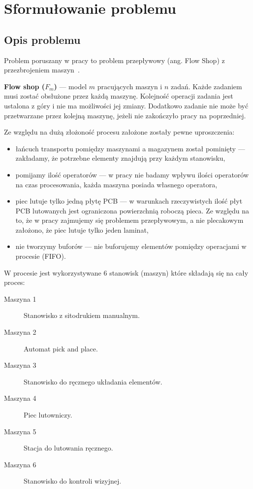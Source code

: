 \chapter{Sformułowanie problemu}

\section{Opis problemu}
Problem poruszany w pracy to problem przepływowy (ang. Flow Shop) z przezbrojeniem maszyn~\cite{188148}.

\breakparagraph{}
\textbf{Flow shop ($F_{m}$)} --- model $m$ pracujących maszyn i $n$ zadań. Każde zadaniem musi zostać obsłużone przez każdą maszynę. Kolejność operacji zadania jest ustalona z góry i nie ma możliwości jej zmiany. Dodatkowo zadanie nie może być przetwarzane przez kolejną maszynę, jeżeli nie zakończyło pracy na poprzedniej.

\breakparagraph{}
Ze względu na dużą złożoność procesu założone zostały pewne uproszczenia:
\begin{itemize}
	\item łańcuch transportu pomiędzy maszynami a magazynem został pominięty --- zakładamy, że potrzebne elementy znajdują przy każdym stanowisku,
	\item pomijamy ilość operatorów --- w pracy nie badamy wpływu ilości operatorów na czas procesowania, każda maszyna posiada własnego operatora,
	\item piec lutuje tylko jedną płytę PCB --- w warunkach rzeczywistych ilość płyt PCB lutowanych jest ograniczona powierzchnią roboczą pieca. Ze względu na to, że w pracy zajmujemy się problemem przepływowym, a nie plecakowym założono, że piec lutuje tylko jeden laminat,
	\item nie tworzymy buforów --- nie buforujemy elementów pomiędzy operacjami w procesie (FIFO).
\end{itemize}

W procesie jest wykorzystywane 6 stanowisk (maszyn) które składają się na cały proces:
\begin{description}
	\item[Maszyna 1] Stanowisko z sitodrukiem manualnym.
	\item[Maszyna 2] Automat pick and place.
	\item[Maszyna 3] Stanowisko do ręcznego układania elementów.
	\item[Maszyna 4] Piec lutowniczy.
	\item[Maszyna 5] Stacja do lutowania ręcznego.
	\item[Maszyna 6] Stanowisko do kontroli wizyjnej.
\end{description}

